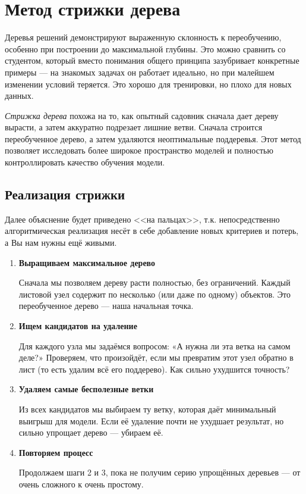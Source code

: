 \section{Метод стрижки дерева}

Деревья решений демонстрируют выраженную склонность к переобучению, особенно при построении до максимальной глубины. Это можно сравнить со студентом, который вместо понимания общего принципа зазубривает конкретные примеры — на знакомых задачах он работает идеально, но при малейшем изменении условий теряется. Это хорошо для тренировки, но плохо для новых данных.

\textit{Стрижка дерева} похожа на то, как опытный садовник сначала дает дереву вырасти, а затем аккуратно подрезает лишние ветви. Сначала строится переобученное дерево, а затем удаляются неоптимальные поддеревья. Этот метод позволяет исследовать более широкое пространство моделей и полностью контроллировать качество обучения модели.

\subsection{Реализация стрижки}

Далее объяснение будет приведено <<на пальцах>>, т.к. непосредственно алгоритмическая реализация несёт в себе добавление новых критериев и потерь, а Вы нам нужны ещё живыми.

\begin{enumerate}
  \item \textbf{Выращиваем максимальное дерево}
  
  Сначала мы позволяем дереву расти полностью, без ограничений. Каждый листовой узел содержит по несколько (или даже по одному) объектов. Это переобученное дерево — наша начальная точка.
  
  \item \textbf{Ищем кандидатов на удаление}
  
  Для каждого узла мы задаёмся вопросом: «А нужна ли эта ветка на самом деле?» Проверяем, что произойдёт, если мы превратим этот узел обратно в лист (то есть удалим всё его поддерево). Как сильно ухудшится точность?
  
  \item \textbf{Удаляем самые бесполезные ветки}
  
  Из всех кандидатов мы выбираем ту ветку, которая даёт минимальный выигрыш для модели. Если её удаление почти не ухудшает результат, но сильно упрощает дерево — убираем её.
  
  \item \textbf{Повторяем процесс}
  
  Продолжаем шаги 2 и 3, пока не получим серию упрощённых деревьев — от очень сложного к очень простому.
\end{enumerate}